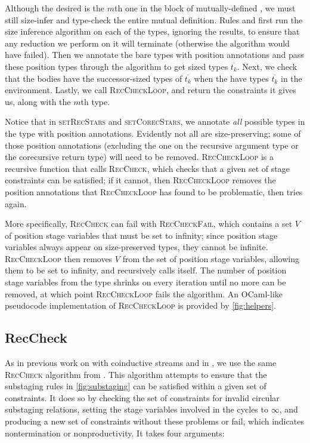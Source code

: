 \documentclass[acmsmall,screen,review,10pt]{acmart} %
\begin{document}
Although the desired \cofixpoint is the $m$th one in the block of mutually-defined \cofixpoints, we must still size-infer and type-check the entire mutual definition. Rules  and  first run the size inference algorithm on each of the \cofixpoint types, ignoring the results, to ensure that any reduction we perform on it will terminate (otherwise the algorithm would have failed). Then we annotate the bare types with position annotations and pass these position types through the algorithm to get sized types $\overline{t_k}$. Next, we check that the \cofixpoint bodies have the successor-sized types of $\overline{t_k}$ when the \cofixpoints have types $\overline{t_k}$ in the environment. Lastly, we call \textsc{RecCheckLoop}, and return the constraints it gives us, along with the $m$th \cofixpoint type.



Notice that in \textsc{setRecStars} and \textsc{setCorecStars}, we annotate \textit{all} possible \coinductive types in the \cofixpoint type with position annotations. Evidently not all \cofixpoints are size-preserving; some of those position annotations (excluding the one on the recursive argument type or the corecursive return type) will need to be removed. \textsc{RecCheckLoop} is a recursive function that calls \textsc{RecCheck}, which checks that a given set of stage constraints can be satisfied; if it cannot, then \textsc{RecCheckLoop} removes the position annotations that \textsc{RecCheckLoop} has found to be problematic, then tries again. 

More specifically, \textsc{RecCheck} can fail with \textsc{RecCheckFail}, which contains a set $V$ of position stage variables that must be set to infinity; since position stage variables always appear on size-preserved types, they cannot be infinite. \textsc{RecCheckLoop} then removes $V$ from the set of position stage variables, allowing them to be set to infinity, and recursively calls itself. The number of position stage variables from the \cofixpoint type shrinks on every iteration until no more can be removed, at which point \textsc{RecCheckLoop} fails the algorithm. An OCaml-like pseudocode implementation of \textsc{RecCheckLoop} is provided by \autoref{fig:helpers}.

\subsection{RecCheck}

As in previous work on \CChatomega with coinductive streams \cite{cc-hat-omega} and in \CIChat, we use the same \textsc{RecCheck} algorithm from \Fhat \cite{f-hat}. This algorithm attempts to ensure that the substaging rules in \autoref{fig:substaging} can be satisfied within a given set of constraints. It does so by checking the set of constraints for invalid circular substaging relations, setting the stage variables involved in the cycles to $\infty$, and producing a new set of constraints without these problems or fail, which indicates nontermination or nonproductivity. It takes four arguments:
\end{document}
